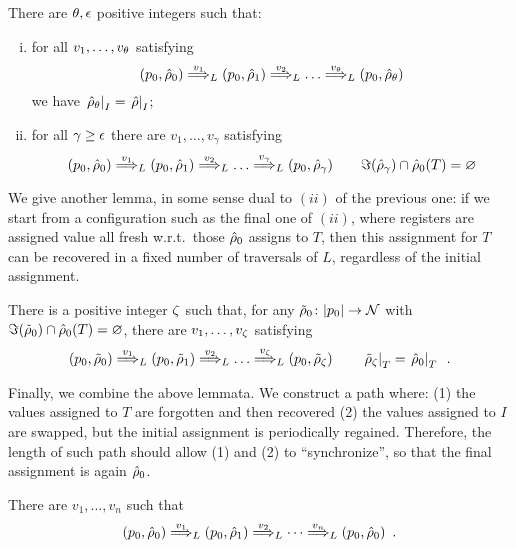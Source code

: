 \begin{lemma} There are $\theta,\epsilon$ positive integers such that:
\label{lem:IT}
\begin{enumerate}[(i)]

\item
for all $v_1,\dots,v_\theta$ satisfying
\[
	(p_0,\hat{\rho}_0) \overset{v_1}{\Longrightarrow}_{L} (p_0,\hat{\rho}_1) \overset{v_2}{\Longrightarrow}_{L} \dots \overset{v_{\theta}}{\Longrightarrow}_{L} (p_0,\hat{\rho}_\theta)
\]
we have $\left. \hat{\rho}_\theta \right|_{I} = \left. \hat{\rho} \right|_{I}$;
\label{idI}

\item %
for all $\gamma \geq \epsilon$ there are $v_1,\dots,v_\gamma$ satisfying
\[
	(p_0,\hat{\rho}_0) \overset{v_1}{\Longrightarrow}_{L} (p_0,\hat{\rho}_1) \overset{v_2}{\Longrightarrow}_{L} \dots \overset{v_\gamma}{\Longrightarrow}_{L} (p_0,\hat{\rho}_\gamma)
	\qquad 
	\Im(\hat{\rho}_\gamma) \cap \hat{\rho}_0(T) = \varnothing
\]
\label{forgetT}
\end{enumerate}
\end{lemma}
%
%
We give another lemma, in some sense dual to $(ii)$ of the previous one: if we start from a configuration such as the final one of $(ii)$, where registers are assigned value all fresh w.r.t.\ those $\hat{\rho}_0$ assigns to $T$, then this assignment for $T$ can be recovered in a fixed number of traversals of $L$, regardless of the initial assignment.

\begin{lemma}
There is a positive integer $\zeta$ such that,
for any $\tilde{\rho}_0 \colon |p_0| \to \mathcal{N}$ with $\Im(\tilde{\rho}_0) \cap \hat{\rho}_0(T) = \varnothing$, there are $v_1,\dots,v_\zeta$ satisfying
\[
	(p_0,\tilde{\rho}_0) \overset{v_1}{\Longrightarrow}_{L} (p_0,\tilde{\rho}_1) \overset{v_2}{\Longrightarrow}_{L} \dots \overset{v_\zeta}{\Longrightarrow}_{L} (p_0,\tilde{\rho}_\zeta)	
	\qquad
	\left.\tilde{\rho}_\zeta\right|_{T} = \left.\hat{\rho}_0\right|_{T} \enspace .
\]
\label{lem:initT}
\end{lemma}


Finally, we combine the above lemmata. We construct a path where: (1) the values assigned to $T$ are forgotten and then recovered (2) the values assigned to $I$ are swapped, but the initial assignment is periodically regained. Therefore, the length of such path should allow (1) and (2) to ``synchronize'', so that the final assignment is again $\hat{\rho}_0$.

\begin{theorem}
\label{thm:loop}


There are $v_1,\dots,v_n$ such that
\[
	(p_0, \hat{\rho}_0) \overset{v_1}{\Longrightarrow}_{L} (p_0, \hat{\rho}_1) \overset{v_2}{\Longrightarrow}_{L} \cdots \overset{v_n}{\Longrightarrow}_{L} (p_0,\hat{\rho}_0) \enspace .
\]
\end{theorem}

